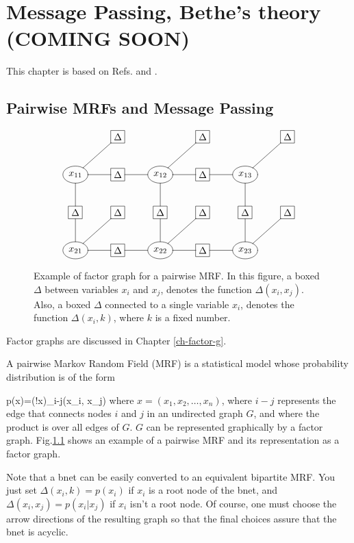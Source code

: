 \chapter{Message Passing, Bethe's theory
(COMING SOON)}
\label{ch-mpass-bethe}

\newcommand{\ttheta}[0]{\TIL{\theta}}
\newcommand{\tP}[0]{\TIL{p}}

This chapter is based
on Refs. \cite{WainJordan}
and \cite{yedidia}.

\section{Pairwise MRFs and Message Passing}


\begin{figure}[h!]
$$\xymatrix{
&*+[F]{\Delta}
&
&*+[F]{\Delta}
&
&*+[F]{\Delta}
\\
*++[o][F]{x_{11}}
\ar@{-}[d]\ar@{-}[r]\ar@{-}[ru]
&*+[F]{\Delta}\ar@{-}[r]
&*++[o][F]{x_{12}}\ar@{-}[d]\ar@{-}[r]
\ar@{-}[ru]
&*+[F]{\Delta}\ar@{-}[r]
&*++[o][F]{x_{13}}\ar@{-}[d]
\ar@{-}[ru]
\\
*+[F]{\Delta}\ar@{-}[d]
&*+[F]{\Delta}
&*+[F]{\Delta}\ar@{-}[d]
&*+[F]{\Delta}
&*+[F]{\Delta}\ar@{-}[d]
&*+[F]{\Delta}
\\
*++[o][F]{x_{21}}\ar@{-}[r]\ar@{-}[ru]
&*+[F]{\Delta}\ar@{-}[r]
&*++[o][F]{x_{22}}\ar@{-}[r]\ar@{-}[ru]
&*+[F]{\Delta}\ar@{-}[r]
&*++[o][F]{x_{23}}\ar@{-}[ru]
}$$
\caption{Example
of factor graph
for a pairwise MRF.
In this figure,
a boxed $\Delta$
between variables $x_i$
and $x_j$,
denotes the function
$\Delta(x_i, x_j)$.
Also, a boxed
$\Delta$
connected to a
single variable $x_i$,
denotes the function
$\Delta(x_i, k)$,
where $k$
is a fixed number.
}
\label{fig-paiwise-mrf}
\end{figure}

Factor graphs
are discussed in Chapter \ref{ch-factor-g}.

A pairwise
Markov Random Field (MRF)
is a statistical model 
whose probability
distribution
is of the form

\beq
p(x)=\caln(!x)\prod_{i-j}\Delta(x_i, x_j)
\label{eq-pairwise-fg}
\eeq
where $x=(x_1, x_2,
\ldots, x_n )$,
where $i-j$
represents the edge
that connects
nodes $i$ and $j$
in an undirected graph $G$,
and where  the product 
is over all edges of $G$.
$G$ can be represented
graphically
by a factor graph.
Fig.\ref{fig-paiwise-mrf}
shows an example
of a pairwise
MRF
and its
representation as a
factor graph.

Note that a bnet can
be easily converted to an
equivalent
bipartite MRF.
You just
set $\Delta(x_i, k)=p(x_i)$
if $x_i$ is a root node
of the bnet,
and $\Delta(x_i, x_j)=p(x_i|x_j) $
if $x_i$ isn't a root node.
Of course, one
must choose
the arrow directions
of the resulting
graph
so that the final
choices assure
that the bnet
is acyclic.

